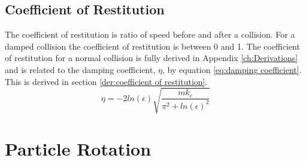 \documentclass[10pt,a4paper,titlepage]{report}
\begin{document}
\subsection{Coefficient of Restitution}
The coefficient of restitution is ratio of speed before and after a collision. For a damped collision the coefficient of restitution is between 0 and 1. The coefficient of restitution for a normal collision is fully derived in Appendix \ref{ch:Derivations} and is related to the damping coefficient, $\eta$, by equation \ref{eq:damping coefficient}. This is derived in section \ref{der:coefficient of restitution}.
\begin{equation}
\eta = - 2 ln(\epsilon) \sqrt{\dfrac{m k_e}{\pi^2 + ln(\epsilon)^2}}
\label{eq:damping coefficient}
\end{equation}
\section{Particle Rotation}
\end{document}
